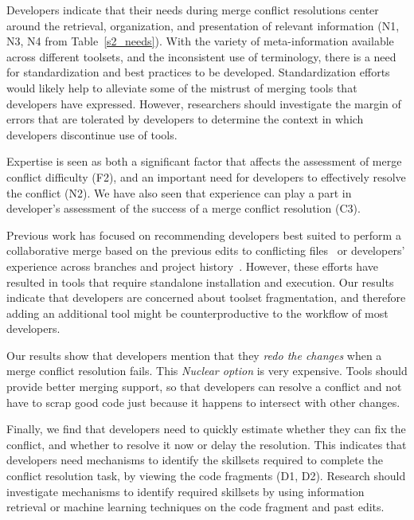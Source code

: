 Developers indicate that their needs during merge conflict resolutions center around the retrieval, organization, and presentation of relevant information (N1, N3, N4 from Table~\ref{s2_needs}).
With the variety of meta-information available across different toolsets, and the inconsistent use of terminology, there is a need for standardization and best practices to be developed.
Standardization efforts would likely help to alleviate some of the mistrust of merging tools that developers have expressed.
However, researchers should investigate the margin of errors that are tolerated by developers to determine the context in which developers discontinue use of tools.

Expertise is seen as both a significant factor that affects the assessment of merge conflict difficulty (F2), and an important need for developers to effectively resolve the conflict (N2).
We have also seen that experience can play a part in developer's assessment of the success of a merge conflict resolution (C3).

Previous work has focused on recommending developers best suited to perform a collaborative merge based on the previous edits to conflicting files~\cite{dasilva2015niche} or developers' experience across branches and project history~\cite{CostaSarma}. 
However, these efforts have resulted in tools that require standalone installation and execution. 
Our results indicate that developers are concerned about toolset fragmentation, and therefore adding an additional tool might be counterproductive to the workflow of most developers. 

Our results show that developers mention that they \emph{redo the changes} when a merge conflict resolution fails.
This \emph{Nuclear option} is very expensive.
Tools should provide better merging support, so that developers can resolve a conflict and not have to scrap good code just because it happens to intersect with other changes.

Finally, we find that developers need to quickly estimate whether they can fix the conflict, and whether to resolve it now or delay the resolution. 
This indicates that developers need mechanisms to identify the skillsets required to complete the conflict resolution task, by viewing the code fragments (D1, D2).
Research should investigate mechanisms to identify required skillsets by using information retrieval or machine learning techniques on the code fragment and past edits.
